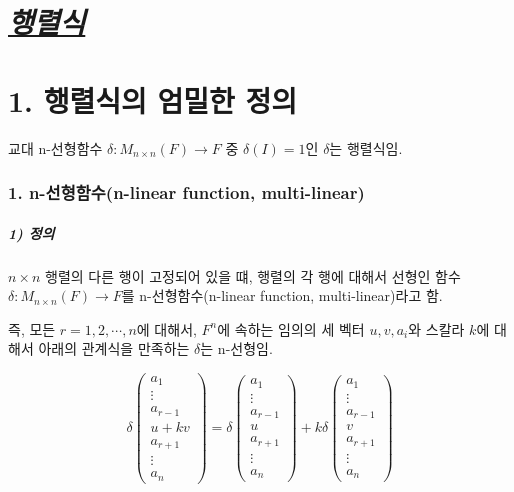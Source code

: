\part{\textit{\underline{행렬식}}}

\part*{1. 행렬식의 엄밀한 정의}

교대 n-선형함수 $\delta:M_{n \times n}(F) \rightarrow F$ 중 $\delta(I)=1$인 $\delta$는 행렬식임.

\section*{1. n-선형함수(n-linear function, multi-linear)}
\subsubsection*{1) 정의\\}
\begin{DEF}
$n \times n$ 행렬의 다른 행이 고정되어 있을 떄, 행렬의 각 행에 대해서 선형인 함수 $\delta : M_{n \times n}(F) \rightarrow F$를 n-선형함수(n-linear function, multi-linear)라고 함.

즉, 모든 $r=1,2, \cdots ,n$에 대해서, $F^n$에 속하는 임의의 세 벡터 $u,v,a_i$와 스칼라 $k$에 대해서 아래의 관계식을 만족하는 $\delta$는 n-선형임.

\[
\delta
\begin{pmatrix}
a_1\\
\vdots\\
a_{r-1}\\
u+kv\\
a_{r+1}\\
\vdots\\
a_n
\end{pmatrix}
=\delta
\begin{pmatrix}
a_1\\
\vdots\\
a_{r-1}\\
u\\
a_{r+1}\\
\vdots\\
a_n
\end{pmatrix}
+k\delta
\begin{pmatrix}
a_1\\
\vdots\\
a_{r-1}\\
v\\
a_{r+1}\\
\vdots\\
a_n
\end{pmatrix}
\]
\end{DEF}

